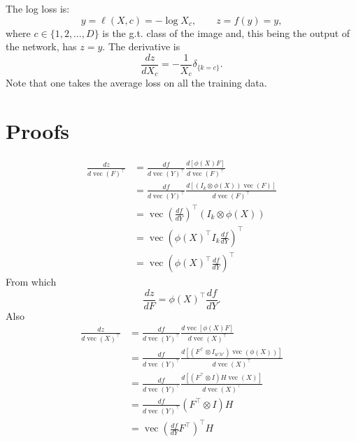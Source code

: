 \documentclass[12pt]{article}
\newcommand{\vv}{\operatorname{vec}}
\begin{document}
The log loss is:
\[
 y = \ell(X,c) = - \log X_c, \qquad z = f(y) = y,
\]
where $c \in \{1,2,\dots,D\}$ is the g.t\@. class of the image and, this being the output of the network, has $z=y$. The derivative is
\[
\frac{dz}{dX_c} = - \frac{1}{X_c} \delta_{\{k = c\}}.
\]
Note that one takes the average loss on all the training data.

\appendix\section{Proofs}\label{s:proofs}

\begin{align*}
\frac{d z}{d \vv(F)^\top}
&=
\frac{d f}{d \vv(Y)^\top}
\frac{d [\phi(X) F]}{d\vv(F)^\top}
\\
&=
\frac{d f}{d \vv(Y)^\top}
\frac{d [\left(
I_k \otimes \phi(X)
\right)
\vv(F)]
}{d\vv(F)^\top}
\\
&=
\vv\left(\frac{d f}{d Y} \right)^\top
\left(
I_k \otimes \phi(X)
\right)
\\
&=
\vv\left(
\phi(X)^\top I_k \frac{d f}{d Y} 
\right)^\top
\\
&=
\vv\left(
\phi(X)^\top
\frac{d f}{d Y} 
\right)^\top
\end{align*}
From which
\[
\frac{dz}{dF}
=
\phi(X)^\top\frac{d f}{d Y}.
\]
Also
\begin{align*}
\frac{d z}{d \vv(X)^\top}
&=
\frac{d f}{d \vv(Y)^\top}
\frac{d \vv [\phi(X) F]}{d\vv(X)^\top}
\\
&=
\frac{d f}{d \vv(Y)^\top}
\frac{d [(F^\top \otimes I_{w'h'})\vv(\phi(X))]}{d\vv(X)^\top}
\\
&=
\frac{d f}{d \vv(Y)^\top}
\frac{d [(F^\top \otimes I)H \vv(X)]}{d\vv(X)^\top}
\\
&=
\frac{d f}{d \vv(Y)^\top} (F^\top\otimes I)H
\\
&=
\vv\left(
\frac{d f}{d Y}F^\top
\right)^\top H
\end{align*}
\end{document}
